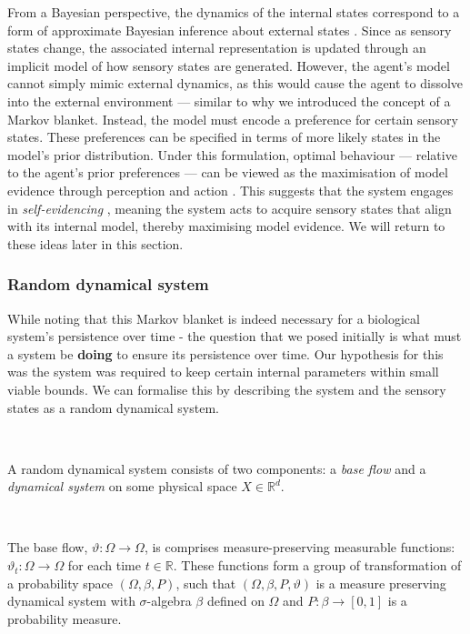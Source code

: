 \documentclass{article}
\newcommand{\R}{\mathbb{R}}
\begin{document}
From a Bayesian perspective, the dynamics of the internal states correspond to a form of approximate Bayesian inference about external states \citep{parr2022ActiveInference}. Since as sensory states change, the associated internal representation is updated through an implicit model of how sensory states are generated. However, the agent’s model cannot simply mimic external dynamics, as this would cause the agent to dissolve into the external environment — similar to why we introduced the concept of a Markov blanket. Instead, the model must encode a preference for certain sensory states. These preferences can be specified in terms of more likely states in the model’s prior distribution. Under this formulation, optimal behaviour — relative to the agent's prior preferences — can be viewed as the maximisation of model evidence through perception and action \citep{parr2022ActiveInference}. This suggests that the system engages in \textit{self-evidencing} \citep{hohwy2016evidencing}, meaning the system acts to acquire sensory states that align with its internal model, thereby maximising model evidence. We will return to these ideas later in this section. 


\subsubsection{Random dynamical system}


While noting that this Markov blanket is indeed necessary for a biological system's persistence over time - the question that we posed initially is what must a system be \textbf{doing} to ensure its persistence over time. Our hypothesis for this was the system was required to keep certain internal parameters within small viable bounds. We can formalise this by describing the system and the sensory states as a random dynamical system. 

\

A random dynamical system consists of two components: a \textit{base flow} and a \textit{dynamical system} on some physical space $X \in \R^d$.

\

The base flow, $\vartheta: \Omega \to \Omega$, is comprises measure-preserving measurable functions: $\vartheta_t: \Omega \to \Omega$ for each time $t \in \R$. These functions form a group of transformation of a probability space $(\Omega, \beta, P)$, such that $(\Omega, \beta, P, \vartheta)$ is a measure preserving dynamical system with $\sigma$-algebra $\beta$ defined on $\Omega$ and $P: \beta \to [0, 1]$ is a probability measure.
\end{document}
